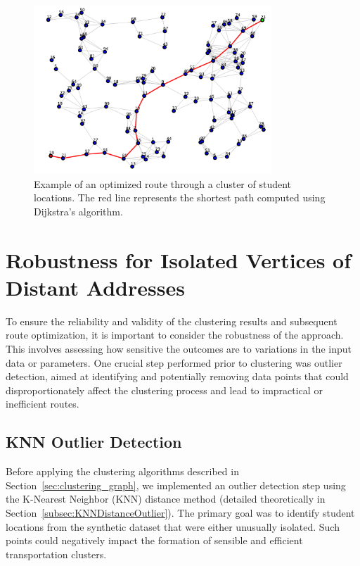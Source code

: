 \begin{figure}[!htbp]
\centering
\includegraphics[width=0.8\textwidth]{img/shortest_path}
\caption{Example of an optimized route through a cluster of student locations. The red line represents the shortest path computed using Dijkstra's algorithm.}
\label{fig:route_optimization}
\end{figure}

\section{Robustness for Isolated Vertices of Distant Addresses}
\label{sec:robustness}

To ensure the reliability and validity of the clustering results and subsequent route optimization, it is important to consider the robustness of the approach. This involves assessing how sensitive the outcomes are to variations in the input data or parameters. One crucial step performed prior to clustering was outlier detection, aimed at identifying and potentially removing data points that could disproportionately affect the clustering process and lead to impractical or inefficient routes.

\subsection{KNN Outlier Detection}
\label{subsec:knn_outlier_application}

Before applying the clustering algorithms described in Section~\ref{sec:clustering_graph}, we implemented an outlier detection step using the K-Nearest Neighbor (KNN) distance method (detailed theoretically in Section~\ref{subsec:KNNDistanceOutlier}). The primary goal was to identify student locations from the synthetic dataset that were either unusually isolated. Such points could negatively impact the formation of sensible and efficient transportation clusters.

